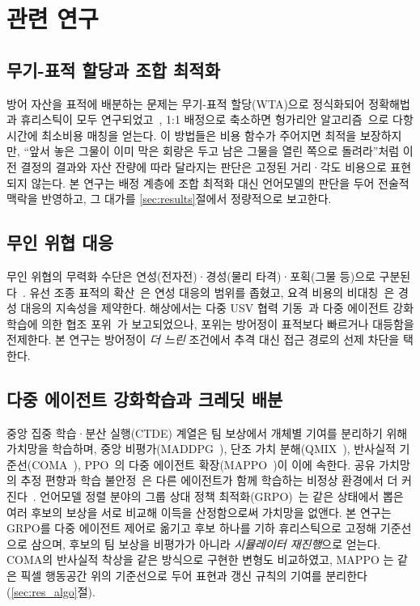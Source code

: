 \section{관련 연구}
\label{sec:related}

\subsection{무기-표적 할당과 조합 최적화}

방어 자산을 표적에 배분하는 문제는 무기-표적 할당(WTA)으로 정식화되어 정확해법과
휴리스틱이 모두 연구되었고~\citep{ahuja2007wta}, 1:1 배정으로 축소하면 헝가리안
알고리즘~\citep{kuhn1955hungarian}으로 다항 시간에 최소비용 매칭을 얻는다. 이 방법들은
비용 함수가 주어지면 최적을 보장하지만, ``앞서 놓은 그물이 이미 막은 회랑은 두고 남은
그물을 열린 쪽으로 돌려라''처럼 이전 결정의 결과와 자산 잔량에 따라 달라지는 판단은 고정된
거리·각도 비용으로 표현되지 않는다. 본 연구는 배정 계층에 조합 최적화 대신 언어모델의
판단을 두어 전술적 맥락을 반영하고, 그 대가를 \ref{sec:results}절에서 정량적으로 보고한다.

\subsection{무인 위협 대응}

무인 위협의 무력화 수단은 연성(전자전)·경성(물리 타격)·포획(그물 등)으로
구분된다~\citep{wang2021cuas}. 유선 조종 표적의 확산~\citep{sutea2026fiber}은 연성 대응의
범위를 좁혔고, 요격 비용의 비대칭~\citep{rumbaugh2024cost}은 경성 대응의 지속성을 제약한다.
해상에서는 다중 USV 협력 기동~\citep{liu2016usv}과 다중 에이전트 강화학습에 의한 협조
포위~\citep{zhang2025encircle}가 보고되었으나, 포위는 방어정이 표적보다 빠르거나 대등함을
전제한다. 본 연구는 방어정이 \emph{더 느린} 조건에서 추격 대신 접근 경로의 선제 차단을 택한다.

\subsection{다중 에이전트 강화학습과 크레딧 배분}

중앙 집중 학습·분산 실행(CTDE) 계열은 팀 보상에서 개체별 기여를 분리하기 위해 가치망을
학습하며, 중앙 비평가(MADDPG~\citep{lowe2017maddpg}), 단조 가치 분해(QMIX~\citep{rashid2018qmix}),
반사실적 기준선(COMA~\citep{foerster2018coma}), PPO~\citep{schulman2017ppo}의 다중 에이전트
확장(MAPPO~\citep{yu2022mappo})이 이에 속한다. 공유 가치망의 추정 편향과 학습 불안정~\citep{haarnoja2018sac}은
다른 에이전트가 함께 학습하는 비정상 환경에서 더 커진다~\citep{lowe2017maddpg}. 언어모델 정렬 분야의 그룹 상대 정책 최적화(GRPO)~\citep{shao2024deepseekmath}는
같은 상태에서 뽑은 여러 후보의 보상을 서로 비교해 이득을 산정함으로써 가치망을 없앤다.
본 연구는 GRPO를 다중 에이전트 제어로 옮기고 후보 하나를 기하 휴리스틱으로 고정해 기준선으로
삼으며, 후보의 팀 보상을 비평가가 아니라 \emph{시뮬레이터 재진행}으로 얻는다. COMA의
반사실적 착상을 같은 방식으로 구현한 변형도 비교하였고, MAPPO 는 같은 픽셀 행동공간 위의
기준선으로 두어 표현과 갱신 규칙의 기여를 분리한다(\ref{sec:res_algo}절).

